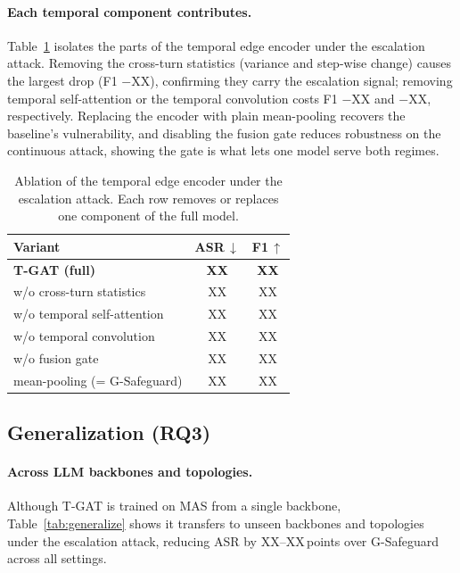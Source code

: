 \paragraph{Each temporal component contributes.}
Table~\ref{tab:ablation} isolates the parts of the temporal edge encoder under the
escalation attack. Removing the cross-turn statistics (variance and step-wise
change) causes the largest drop (F1 $-$XX), confirming they carry the escalation
signal; removing temporal self-attention or the temporal convolution costs F1
$-$XX and $-$XX, respectively. Replacing the encoder with plain mean-pooling
recovers the baseline's vulnerability, and disabling the fusion gate reduces
robustness on the continuous attack, showing the gate is what lets one model serve
both regimes.

\begin{table}[t]
\centering
\setlength{\tabcolsep}{5pt}
\begin{tabular}{lcc}
\toprule
Variant & ASR\,$\downarrow$ & F1\,$\uparrow$ \\
\midrule
\textbf{T-GAT (full)}            & \textbf{XX} & \textbf{XX} \\
\;\; w/o cross-turn statistics   & XX & XX \\
\;\; w/o temporal self-attention & XX & XX \\
\;\; w/o temporal convolution    & XX & XX \\
\;\; w/o fusion gate             & XX & XX \\
\;\; mean-pooling (= G-Safeguard) & XX & XX \\
\bottomrule
\end{tabular}
\caption{Ablation of the temporal edge encoder under the escalation attack. Each
row removes or replaces one component of the full model.}
\label{tab:ablation}
\end{table}

\subsection{Generalization (RQ3)}
\label{sec:exp_generalize}

\paragraph{Across LLM backbones and topologies.}
Although T-GAT is trained on MAS from a single backbone, Table~\ref{tab:generalize}
shows it transfers to unseen backbones and topologies under the escalation attack,
reducing ASR by XX--XX\,points over G-Safeguard across
all settings.

